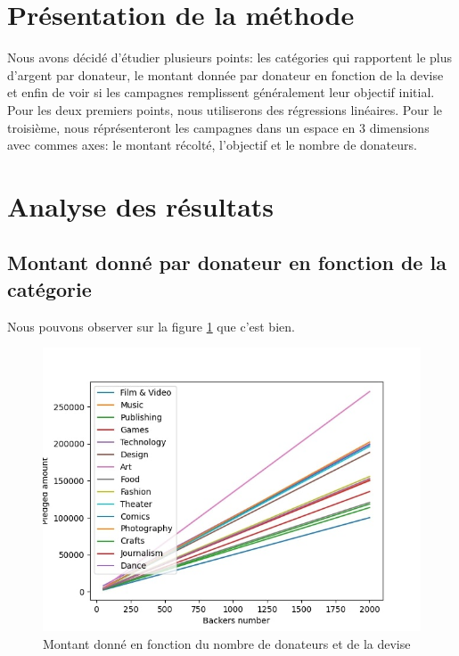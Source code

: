 \documentclass{article}
\begin{document}
\section{Présentation de la méthode}
\label{methode}
\tabto{1cm} Nous avons décidé d'étudier plusieurs points: les catégories qui rapportent le plus d'argent par donateur, le montant donnée par donateur en fonction de la devise et enfin de voir si les campagnes remplissent généralement leur objectif initial.
\tabto{1cm}Pour les deux premiers points, nous utiliserons des régressions linéaires. 
\tabto{1cm} Pour le troisième, nous réprésenteront les campagnes dans un espace en 3 dimensions avec commes axes: le montant récolté, l'objectif et le nombre de donateurs.
\section{Analyse des résultats}
\label{analyse}

\subsection{Montant donné par donateur en fonction de la catégorie}
\label{devise}
Nous pouvons observer sur la figure \ref{fig_categorie} que c'est bien.

\begin{figure}[htbp]
    \graphicspath{{graph/}} 
    \centerline{\includegraphics[scale=0.4]{main_category.jpg}}
    \caption{Montant donné en fonction du nombre de donateurs et de la devise}
    \label{fig_categorie}
\end{figure}    
\newpage 
\end{document}
